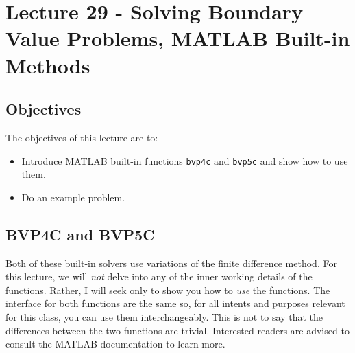 \chapter{Lecture 29 - Solving Boundary Value Problems, MATLAB Built-in Methods}
\label{ch:lec29n}
\section{Objectives}
The objectives of this lecture are to:
\begin{itemize}
\item Introduce MATLAB built-in functions \lstinline[style=myMatlab]{bvp4c} and \lstinline[style=myMatlab]{bvp5c} and show how to use them.
\item Do an example problem.
\end{itemize}
\setcounter{lstannotation}{0}

\section{BVP4C and BVP5C}

Both of these built-in solvers use variations of the finite difference method.  For this lecture, we will \emph{not} delve into any of the inner working details of the functions.  Rather, I will seek only to show you how to \emph{use} the functions.  The interface for both functions are the same so, for all intents and purposes relevant for this class, you can use them interchangeably.  This is not to say that the differences between the two functions are trivial.  Interested readers are advised to consult the MATLAB documentation to learn more.

